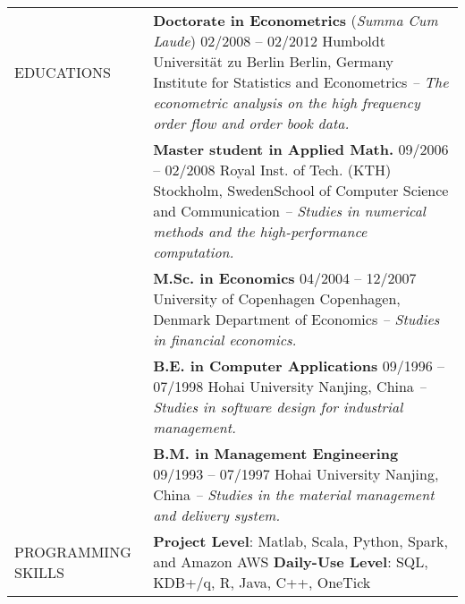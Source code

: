\documentclass[a4paper,10pt]{article}
\begin{document}
\begin{longtable}[h]{p{}p{}}
EDUCATIONS
& \textbf{Doctorate in Econometrics} \small{(\emph{Summa Cum Laude})} \hfill 02/2008 -- 02/2012 \newline Humboldt Universit\"at zu Berlin \hfill Berlin, Germany \newline Institute for Statistics and Econometrics\newline
    \emph{-- The econometric analysis on the high frequency order flow and order book data.}\\
  & \textbf{Master student in Applied Math.} \hfill 09/2006 -- 02/2008 \newline Royal Inst. of Tech. (KTH) \hfill Stockholm, Sweden\newline School of Computer Science and Communication \newline
	\emph{-- Studies in numerical methods and the high-performance computation.} \\
  & \textbf{M.Sc. in Economics} \hfill 04/2004 -- 12/2007 \newline University of Copenhagen \hfill Copenhagen, Denmark  \newline Department of Economics \newline\emph{-- Studies in financial economics.}\\
  & \textbf{B.E. in Computer Applications} \hfill 09/1996 -- 07/1998 \newline Hohai University \hfill Nanjing, China \newline\emph{-- Studies in software design for industrial management.}\\
  & \textbf{B.M. in Management Engineering} \hfill 09/1993 -- 07/1997 \newline Hohai University \hfill Nanjing, China \newline\emph{-- Studies in the material management and delivery system.}\newline\\
PROGRAMMING \newline SKILLS
    & \textbf{Project Level}: Matlab, Scala, Python, Spark, and Amazon AWS \newline
    \textbf{Daily-Use Level}: SQL, KDB+/q, R, Java, C++, OneTick \\
\end{longtable}
\end{document}

